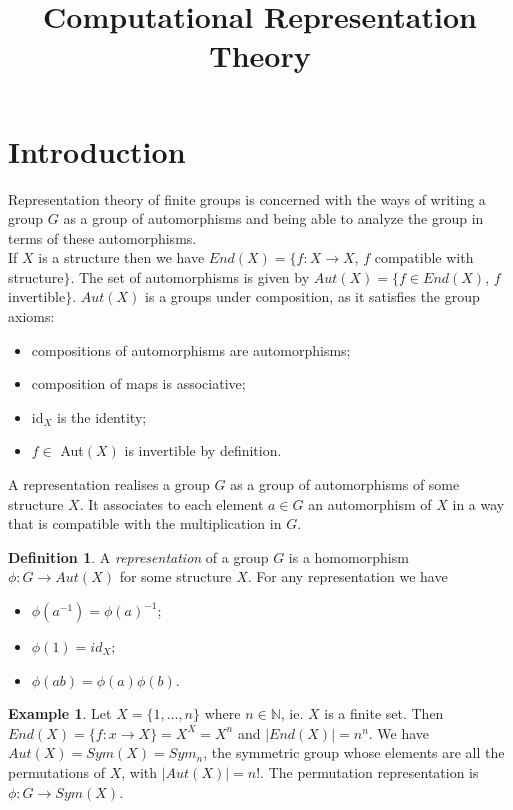 \documentclass[12pt]{amsart}
\title{Computational Representation Theory}
\theoremstyle{definition}
\newtheorem{example}[theorem]{Example}
\newtheorem{definition}[theorem]{Definition}
\begin{document}
\maketitle

\tableofcontents

\section{Introduction}
\label{sec:intro}

Representation theory of finite groups is concerned with the ways of writing a group $G$ as a group of automorphisms and being able to analyze the group in terms of these automorphisms.\\
If $X$ is a structure then we have $End(X)=\{f:X\rightarrow X$, $f$ compatible with structure$\}$.  The set of automorphisms is given by $Aut(X)=\{f\in End(X)$, $f$ invertible$\}$.  $Aut(X)$ is a groups under composition, as it satisfies the group axioms:
\begin{itemize}
\item compositions of automorphisms are automorphisms; \item composition of maps is associative; \item id$_X$ is the identity; \item $f\in$ Aut$(X)$ is invertible by definition.
\end{itemize}
A representation realises a group $G$ as a group of automorphisms of some structure $X$.  It associates to each element $a\in G$ an automorphism of $X$ in a way that is compatible with the multiplication in $G$.

\begin{definition}
A \emph{representation} of a group $G$ is a homomorphism $\phi:G\rightarrow Aut(X)$ for some structure $X$.  For any representation we have
\begin{itemize}
\item $\phi(a^{-1})=\phi(a)^{-1}$; \item $\phi(1)=id_X$; \item $\phi(ab)=\phi(a)\phi(b)$.
\end{itemize}
\end{definition}

\begin{example}
Let $X=\{1,\ldots,n\}$ where $n\in\mathbb{N}$, ie. $X$ is a finite set.  Then $End(X)=\{f:x\rightarrow X\}=X^X=X^n$ and $|End(X)|=n^n$.  We have $Aut(X)=Sym(X)=Sym_n$, the symmetric group whose elements are all the permutations of $X$, with $|Aut(X)|=n!$.  The permutation representation is $\phi:G\rightarrow Sym(X)$.
\end{example}
\end{document}
